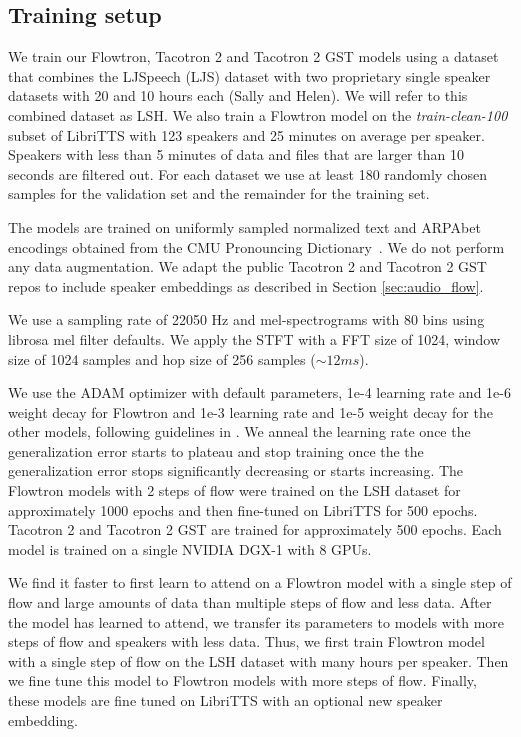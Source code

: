 \documentclass{article}
\begin{document}
\subsection{Training setup}
We train our Flowtron, Tacotron 2 and Tacotron 2 GST models using a dataset that combines the LJSpeech (LJS) dataset \cite{ito2017lj} with two proprietary single speaker datasets with 20 and 10 hours each (Sally and Helen). We will refer to this combined dataset as LSH. We also train a Flowtron model on the \textit{train-clean-100} subset of LibriTTS \cite{zen2019libritts} with 123 speakers and 25 minutes on average per speaker. Speakers with less than 5 minutes of data and files that are larger than 10 seconds are filtered out. For each dataset we use at least 180 randomly chosen samples for the validation set and the remainder for the training set. 

The models are trained on uniformly sampled normalized text and ARPAbet encodings obtained from the CMU Pronouncing Dictionary~\cite{weide1998cmu}. We do not perform any data augmentation. We adapt the public Tacotron 2 and Tacotron 2 GST repos to include speaker embeddings as described in Section \ref{sec:audio_flow}.


We use a sampling rate of 22050 Hz and mel-spectrograms with 80 bins using librosa mel filter defaults. We apply the STFT with a FFT size of 1024, window size of 1024 samples and hop size of 256 samples ($\sim 12ms$).

We use the ADAM \cite{kingma2014adam} optimizer with default parameters, 1e-4 learning rate and 1e-6 weight decay for Flowtron and 1e-3 learning rate and 1e-5 weight decay for the other models, following guidelines in \cite{wang2017tacotron}. We anneal the learning rate once the generalization error starts to plateau and stop training once the the generalization error stops significantly decreasing or starts increasing. The Flowtron models with 2 steps of flow were trained on the LSH dataset for approximately 1000 epochs and then fine-tuned on LibriTTS for 500 epochs. Tacotron 2 and Tacotron 2 GST are trained for approximately 500 epochs. Each model is trained on a single NVIDIA DGX-1 with 8 GPUs.

We find it faster to first learn to attend on a Flowtron model with a single step of flow and large amounts of data than multiple steps of flow and less data. After the model has learned to attend, we transfer its parameters to models with more steps of flow and  speakers with less data. Thus, we first train Flowtron model with a single step of flow on the LSH dataset with many hours per speaker. Then we fine tune this model to Flowtron models with more steps of flow. Finally, these models are fine tuned on LibriTTS with an optional new speaker embedding.
\end{document}
